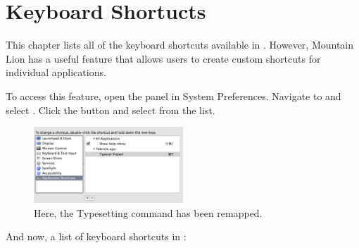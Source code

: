 \chapter{Keyboard Shortucts}
\label{shortcuts}

This chapter lists all of the keyboard shortcuts available in \texnicle. However, Mountain Lion has a useful feature that allows users to create custom shortcuts for individual applications.

To access this feature, open the  panel in System Preferences. Navigate to  and select . Click the \keys{\ensuremath{+}} button and select \texnicle from the list.
\begin{figure}[htbp]
\centering
\includegraphics[width=0.5\textwidth]{TeXnicle-Images/texnicle-customshortcut.png}
\caption{Here, the Typesetting command has been remapped.}
\label{fig:texnicle-customshortcut}
\end{figure}

And now, a list of keyboard shortcuts in {\texnicle}:

